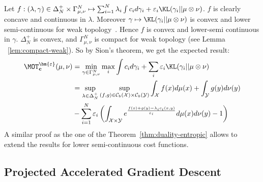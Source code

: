 \begin{prv*}
Let $f: (\lambda,\gamma)\in\Delta_N^{+}\times\Gamma^N_{\mu,\nu}\mapsto\sum_{i=1}^N \lambda_i\int c_i d\gamma_i + \varepsilon_i \KL(\gamma_i||\mu\otimes\nu)$. $f$ is clearly concave and continuous in $\lambda$. Moreover $\gamma\mapsto \KL(\gamma_i||\mu\otimes\nu)$ is convex and lower semi-continuous for weak topology~\citep[Lemma 1.4.3]{dupuis2011weak}. Hence $f$ is convex and lower-semi continuous in $\gamma$. $\Delta_N^{+}$ is  convex, and  $\Gamma^N_{\mu,\nu}$ is compact for weak topology (see  Lemma
~\ref{lem:compact-weak}). So by Sion's theorem,  we get the expected  result:
\begin{align*}
    \MOT_{\mathbf{c}}^{\bm{\varepsilon}}(\mu,\nu)&=\min_{\gamma\in\Gamma^N_{\mu,\nu}} \max_i\int c_i d\gamma_i + \sum_i\varepsilon_i \KL(\gamma_i||\mu\otimes\nu)\\
    &=\sup_{\lambda\in\Delta_N^{+}} \sup_{(f,g)\in\mathcal{C}_b(\mathcal{X})\times\mathcal{C}_b(\mathcal{Y})}\int_{\mathcal{X}} f(x)d\mu(x)+ \int_{\mathcal{Y}} g(y)d\nu(y)\\
&-\sum_{i=1}^N\varepsilon_i\left( \int_{\mathcal{X}\times\mathcal{Y}} e^{\frac{f(x)+g(y)-\lambda_ic_i(x,y)}{\varepsilon_i}} d\mu(x)d\nu(y)-1\right)
\end{align*}
A similar proof as the one of the Theorem~\ref{thm:duality-entropic} allows to extend the results for lower semi-continuous cost functions.
\end{prv*}






\subsection{Projected Accelerated Gradient Descent}
\label{sec:pgd}

